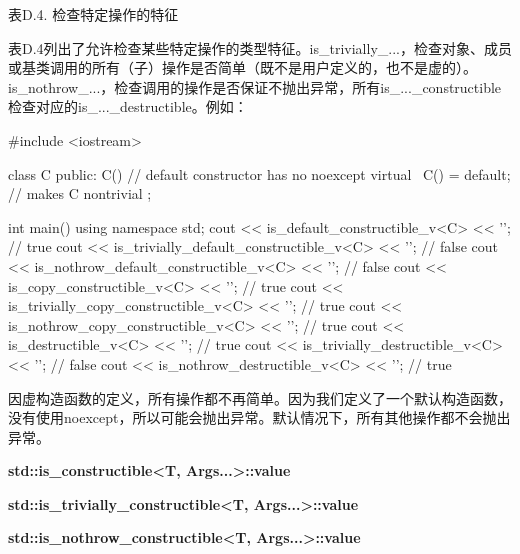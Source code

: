 \begin{center}
表D.4. 检查特定操作的特征
\end{center}

表D.4列出了允许检查某些特定操作的类型特征。is\_trivially\_...，检查对象、成员或基类调用的所有（子）操作是否简单（既不是用户定义的，也不是虚的）。is\_nothrow\_...，检查调用的操作是否保证不抛出异常，所有is\_...\_constructible检查对应的is\_...\_destructible。例如：

\begin{cpp}
#include <iostream>

class C {
	public:
	C() { // default constructor has no noexcept
	}
	virtual ~C() = default; // makes C nontrivial
};

int main() {
	using namespace std;
	cout << is_default_constructible_v<C> << '\n'; // true
	cout << is_trivially_default_constructible_v<C> << '\n'; // false
	cout << is_nothrow_default_constructible_v<C> << '\n'; // false
	cout << is_copy_constructible_v<C> << '\n'; // true
	cout << is_trivially_copy_constructible_v<C> << '\n'; // true
	cout << is_nothrow_copy_constructible_v<C> << '\n'; // true
	cout << is_destructible_v<C> << '\n'; // true
	cout << is_trivially_destructible_v<C> << '\n'; // false
	cout << is_nothrow_destructible_v<C> << '\n'; // true
}
\end{cpp}

因虚构造函数的定义，所有操作都不再简单。因为我们定义了一个默认构造函数，没有使用noexcept，所以可能会抛出异常。默认情况下，所有其他操作都不会抛出异常。

\textbf{std::is\_constructible<T, Args...>::value}

\textbf{std::is\_trivially\_constructible<T, Args...>::value}

\textbf{std::is\_nothrow\_constructible<T, Args...>::value}

